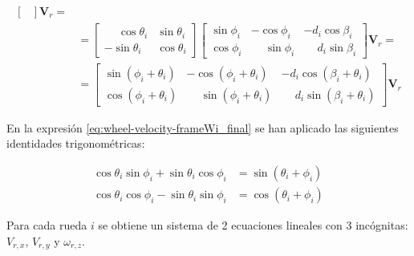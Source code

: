 \documentclass[11pt,a4paper]{article}
\newcommand{\vect}[1]{\bm{#1}}       %
\begin{document}
\begin{equation}
\begin{aligned}
\begin{bmatrix}
                                                                \end{bmatrix} \vect{V}_r =                                                                        \\
                                 & = \begin{bmatrix}
                                         \phantom{-}\cos\theta_i & \sin\theta_i \\
                                         -\sin\theta_i           & \cos\theta_i
                                     \end{bmatrix} \begin{bmatrix}
                                                       \sin\phi_i & -\cos\phi_i           & -d_i\cos\beta_i           \\
                                                       \cos\phi_i & \phantom{-}\sin\phi_i & \phantom{-}d_i\sin\beta_i
                                                   \end{bmatrix} \vect{V}_r =                                                            \\
                                 & = \begin{bmatrix}
                                         \sin\left(\phi_i + \theta_i \right) & -\cos\left(\phi_i + \theta_i\right)           & -d_i\cos\left(\beta_i + \theta_i\right)           \\
                                         \cos\left(\phi_i + \theta_i\right)  & \phantom{-}\sin\left(\phi_i + \theta_i\right) & \phantom{-}d_i\sin\left(\beta_i + \theta_i\right)
                                     \end{bmatrix} \vect{V}_r
    \end{aligned}
    \label{eq:wheel-velocity-frameWi_final}
\end{equation}

En la expresión \ref{eq:wheel-velocity-frameWi_final} se han aplicado las siguientes identidades trigonométricas:

\[
    \begin{aligned}
        \cos\theta_i\sin\phi_i + \sin\theta_i\cos\phi_i & = \sin\left(\theta_i + \phi_i\right) \\
        \cos\theta_i\cos\phi_i - \sin\theta_i\sin\phi_i & = \cos\left(\theta_i + \phi_i\right)
    \end{aligned}
\]

Para cada rueda \(i\) se obtiene un sistema de 2 ecuaciones lineales con 3 incógnitas: \(V_{r,x}\), \(V_{r,y}\) y \(\omega_{r,z}\).
\end{document}
